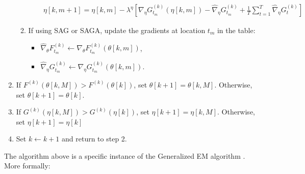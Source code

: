 \begin{enumerate}
\begin{enumerate}
\begin{enumerate}
\begin{gather}
                \eta[k,m+1] = \eta[k,m] - \lambda^{\eta} \left[\nabla_\eta G_{t_m}^{(k)}(\eta[k,m]) - \widehat \nabla_\eta G_{t_m}^{(k)} + \frac{1}{T} \sum_{t=1}^T \widehat \nabla_\eta G^{(k)}_{t} \right]
            \end{gather}
        \end{enumerate}
        \item If using SAG or SAGA, update the gradients at location $t_m$ in the table:
        \begin{itemize}
            \item $\widehat \nabla_\theta F_{t_m}^{(k)} \leftarrow \nabla_\theta F_{t_m}^{(k)}(\theta[k,m])$,
            \item $\widehat \nabla_\eta G_{t_m}^{(k)} \leftarrow \nabla_\eta G_{t_m}^{(k)}(\theta[k,m])$.
        \end{itemize}
    \end{enumerate}
    \item If $F^{(k)}(\theta[k,M]) > F^{(k)}(\theta[k])$, set $\theta[k+1] = \theta[k,M]$. Otherwise, set $\theta[k+1] = \theta[k]$.
    \item If $G^{(k)}(\eta[k,M]) > G^{(k)}(\eta[k])$, set $\eta[k+1] = \eta[k,M]$. Otherwise, set $\eta[k+1] = \eta[k]$
    \item Set $k \leftarrow k+1$ and return to step 2.
\end{enumerate}

The algorithm above is a specific instance of the Generalized EM algorithm \citep{Dempster:1977}. More formally:

